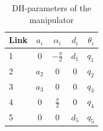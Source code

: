 \begin{table}[htbp]
    \centering
    \caption{DH-parameters of the manipulator}
    \label{table:dhparms}
    \begin{tabular}{l c c c r}
         \toprule
         Link & $a_i$ & $\alpha_i$ & $d_i$ & $\theta_i$ \\
         \midrule
         1 & 0 & $-\frac{\pi}{2}$ & $d_1$ & $q_1$ \\
         2 & $a_2$ & 0 & 0 & $q_2$ \\ 
         3 & $a_3$ & 0 & 0 & $q_3$\\
         4 & 0 & $\frac{\pi}{2}$ & 0 & $q_4$\\
         5 & 0 & 0 & $d_5$ & $q_5$\\
         \bottomrule
    \end{tabular}
\end{table}

